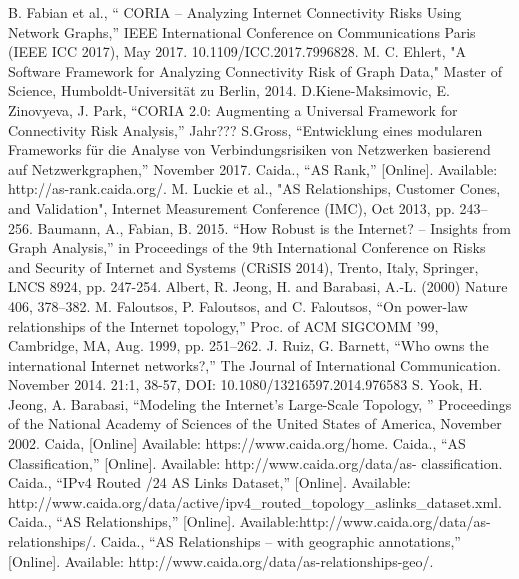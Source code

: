\documentclass[conference, 11pt]{IEEEtran}
\begin{document}
\begin{thebibliography}{00}
B. Fabian et al., `` CORIA – Analyzing Internet Connectivity Risks Using Network Graphs,'' IEEE International Conference on Communications Paris (IEEE ICC 2017), May 2017. 10.1109/ICC.2017.7996828. 
M. C. Ehlert, "A Software Framework for Analyzing Connectivity Risk of Graph Data," Master of Science, Humboldt-Universität zu Berlin, 2014. 
 D.Kiene-Maksimovic, E. Zinovyeva, J. Park, ``CORIA 2.0: Augmenting a Universal Framework for Connectivity Risk Analysis,'' Jahr???
S.Gross, ``Entwicklung eines modularen Frameworks für die Analyse von Verbindungsrisiken von Netzwerken basierend auf Netzwerkgraphen,'' November 2017.
 Caida., ``AS Rank,'' [Online]. Available: http://as-rank.caida.org/.
M. Luckie et al., "AS Relationships, Customer Cones, and Validation", Internet Measurement Conference (IMC), Oct 2013, pp. 243--256.
Baumann, A., Fabian, B. 2015. “How Robust is the Internet? – Insights
from Graph Analysis,” in Proceedings of the 9th International
Conference on Risks and Security of Internet and Systems (CRiSIS
2014), Trento, Italy, Springer, LNCS 8924, pp. 247-254.
Albert, R. Jeong, H. and Barabasi, A.-L. (2000) Nature 406, 378–382.
 M. Faloutsos, P. Faloutsos, and C. Faloutsos, “On power-law relationships of the Internet topology,” Proc. of ACM SIGCOMM ’99, Cambridge, MA, Aug. 1999, pp. 251–262.
J. Ruiz, G. Barnett, ``Who owns the international Internet networks?,'' The Journal of International
Communication. November 2014. 21:1, 38-57, DOI:
10.1080/13216597.2014.976583
S. Yook, H. Jeong, A. Barabasi, ``Modeling the Internet's Large-Scale Topology, '' Proceedings of the National Academy of Sciences of the 
United States of America, November 2002.
Caida, [Online] Available: https://www.caida.org/home.
Caida., ``AS Classification,'' [Online]. Available: http://www.caida.org/data/as-
classification.
Caida., ``IPv4 Routed /24 AS Links Dataset,'' [Online]. Available: http://www.caida.org/data/active/ipv4\_routed\_topology\_aslinks\_dataset.xml.
Caida., ``AS Relationships,'' [Online]. Available:http://www.caida.org/data/as-relationships/.
Caida., ``AS Relationships -- with geographic annotations,'' [Online]. Available: http://www.caida.org/data/as-relationships-geo/.



\end{thebibliography}
\end{document}
